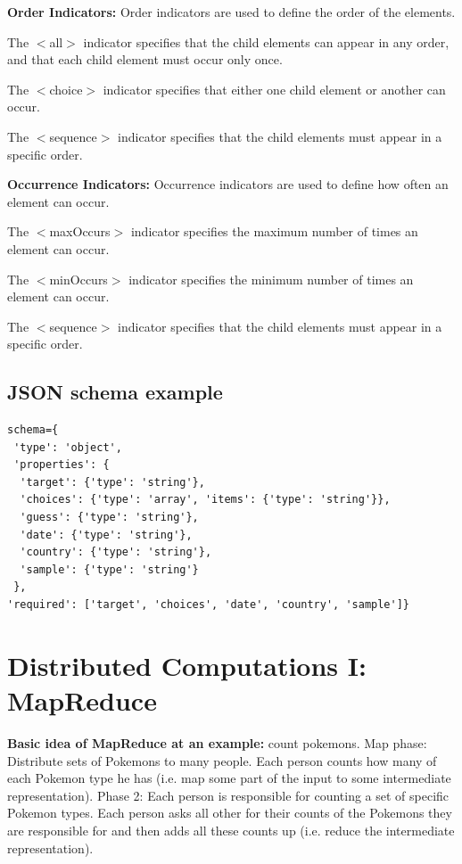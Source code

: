 \documentclass[11pt,oneside,a4paper]{article}
\begin{document}
\newpage

\textbf{Order Indicators:} Order indicators are used to define the order of the elements.
\begin{compactitem}
\item The $<$all$>$ indicator specifies that the child elements can appear in any order, and that each child element must occur only once.
\item The $<$choice$>$ indicator specifies that either one child element or another can occur.
\item The $<$sequence$>$ indicator specifies that the child elements must appear in a specific order.
\end{compactitem}

\textbf{Occurrence Indicators:} Occurrence indicators are used to define how often an element can occur.
\begin{compactitem}
\item The $<$maxOccurs$>$ indicator specifies the maximum number of times an element can occur.
\item The $<$minOccurs$>$ indicator specifies the minimum number of times an element can occur.
\item The $<$sequence$>$ indicator specifies that the child elements must appear in a specific order.
\end{compactitem}

\subsection{JSON schema example}

\begin{lstlisting}[basicstyle=\footnotesize]
schema={
 'type': 'object',
 'properties': {
  'target': {'type': 'string'},
  'choices': {'type': 'array', 'items': {'type': 'string'}},
  'guess': {'type': 'string'},
  'date': {'type': 'string'},
  'country': {'type': 'string'},
  'sample': {'type': 'string'}
 },
'required': ['target', 'choices', 'date', 'country', 'sample']}
\end{lstlisting}



\newpage

\section{Distributed Computations I: MapReduce}

\textbf{Basic idea of MapReduce at an example:} count pokemons. Map phase: Distribute sets of Pokemons to many people. Each person counts how many of each Pokemon type he has (i.e. map some part of the input to some intermediate representation). Phase 2: Each person is responsible for counting a set of specific Pokemon types. Each person asks all other for their counts of the Pokemons they are responsible for and then adds all these counts up (i.e. reduce the intermediate representation).\\
\end{document}
